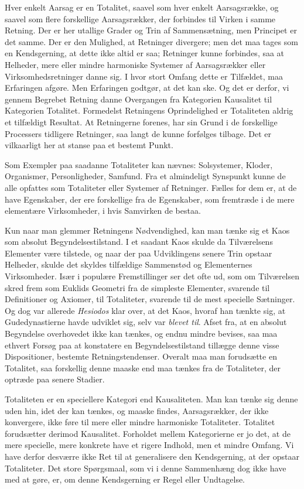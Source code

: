 \documentclass[12pt,a4paper]{book}
\newcommand{\apage}[1]{\marginnote{\footnotesize\textit{[#1]}}}
\begin{document}
Hver enkelt Aarsag er en Totalitet, saavel som hver enkelt Aarsagsrække, og saavel
som flere forskellige Aarsagsrækker, der forbindes til Virken i samme Retning. Der
er her utallige Grader og Trin af Sammensætning, men Principet er det samme. Der
er den Mulighed, at Retninger divergere; men det maa tages som en Kendsgerning, at
dette ikke altid er saa; Retninger kunne forbindes, saa at Helheder, mere eller
mindre harmoniske Systemer af Aarsagsrækker eller Virksomhedsretninger danne sig. I
hvor stort Omfang dette er \apage{220} Tilfældet, maa Erfaringen afgøre. Men Erfaringen
godtgør, at det kan ske. Og det er derfor, vi gennem Begrebet Retning danne
Overgangen fra Kategorien Kausalitet til Kategorien Totalitet. Formedelst
Retningens Oprindelighed er Totaliteten aldrig et tilfældigt Resultat. At Retningerne forenes, har sin Grund i de forskellige Processers tidligere Retninger, saa langt
de kunne forfølges tilbage. Det er vilkaarligt her at stanse paa et bestemt Punkt.

Som Exempler paa saadanne Totaliteter kan nævnes: Solsystemer, Kloder, Organismer,
Personligheder, Samfund. Fra et almindeligt Synspunkt kunne de alle opfattes som
Totaliteter eller Systemer af Retninger. Fælles for dem er, at de have Egenskaber,
der ere forskellige fra de Egenskaber, som fremtræde i de mere elementære
Virksomheder, i hvis Samvirken de bestaa.

Kun naar man glemmer Retningens Nødvendighed, kan man tænke sig et Kaos som absolut
Begyndelsestilstand. I et saadant Kaos skulde da Tilværelsens Elementer være
tilstede, og naar der paa Udviklingens senere Trin opstaar Helheder, skulde det
skyldes tilfældige Sammenstød og Elementernes Virksomheder. Især i populære
Fremstillinger ser det ofte ud, som om Tilværelsen skred frem som Euklids Geometri
fra de simpleste Elementer, svarende til Definitioner og Axiomer, til Totaliteter,
svarende til de mest specielle Sætninger. Og dog var allerede \emph{Hesiodos} klar
over, at det Kaos, hvoraf han tænkte sig, at Gudedynastierne havde udviklet sig,
selv var \emph{blevet til}. Afset fra, at en absolut Begyndelse overhovedet ikke
kan tænkes, og endnu mindre bevises, saa maa ethvert Forsøg paa at konstatere en
Begyndelsestilstand tillægge denne visse Dispositioner, bestemte Retningstendenser.
Overalt maa man forudsætte en Totalitet, saa forskellig denne maaske end maa
tænkes fra de Totaliteter, der optræde paa senere Stadier.

Totaliteten er en speciellere Kategori end Kausaliteten. Man kan tænke sig denne
uden hin, idet der kan tænkes, og maaske findes, Aarsagsrækker, der ikke
konvergere, ikke føre til mere eller mindre harmoniske Totaliteter. Totalitet
forudsætter derimod Kausalitet. Forholdet mellem Kategorierne \apage{221} er jo det, at de
mere specielle, mere konkrete have et rigere Indhold, men et mindre Omfang. Vi
have derfor desværre ikke Ret til at generalisere den Kendsgerning, at der opstaar
Totaliteter. Det store Spørgsmaal, som vi i denne Sammenhæng dog ikke have med at
gøre, er, om denne Kendsgerning er Regel eller Undtagelse.
\end{document}
